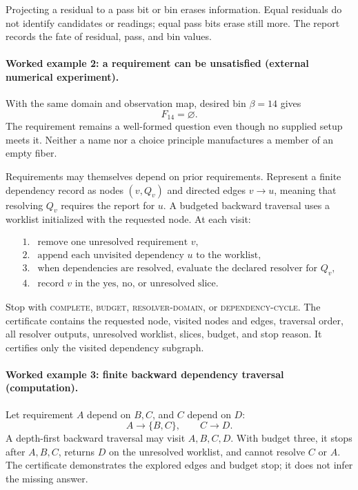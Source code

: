 Projecting a residual to a pass bit or bin erases information.  Equal residuals do not identify candidates or readings;
equal pass bits erase still more.  The report records the fate of residual, pass, and bin values.

\paragraph{Worked example 2: a requirement can be unsatisfied (external numerical experiment).}
With the same domain and observation map, desired bin \(\beta=14\) gives
\[
                         F_{14}=\varnothing.
\]
The requirement remains a well-formed question even though no supplied setup meets it.  Neither a name nor a choice
principle manufactures a member of an empty fiber.

Requirements may themselves depend on prior requirements.  Represent a finite dependency record as nodes
\((v,Q_v)\) and directed edges \(v\to u\), meaning that resolving \(Q_v\) requires the report for \(u\).  A budgeted
backward traversal uses a worklist initialized with the requested node.  At each visit:

\[
\begin{array}{ll}
1.&\text{remove one unresolved requirement }v,\\
2.&\text{append each unvisited dependency }u\text{ to the worklist},\\
3.&\text{when dependencies are resolved, evaluate the declared resolver for }Q_v,\\
4.&\text{record }v\text{ in the yes, no, or unresolved slice.}
\end{array}
\]

Stop with \textsc{complete}, \textsc{budget}, \textsc{resolver-domain}, or \textsc{dependency-cycle}.  The certificate
contains the requested node, visited nodes and edges, traversal order, all resolver outputs, unresolved worklist,
slices, budget, and stop reason.  It certifies only the visited dependency subgraph.

\paragraph{Worked example 3: finite backward dependency traversal (computation).}
Let requirement \(A\) depend on \(B,C\), and \(C\) depend on \(D\):
\[
                         A\to\{B,C\},\qquad C\to D.
\]
A depth-first backward traversal may visit \(A,B,C,D\).  With budget three, it stops after \(A,B,C\), returns \(D\) on
the unresolved worklist, and cannot resolve \(C\) or \(A\).  The certificate demonstrates the explored edges and budget
stop; it does not infer the missing answer.

